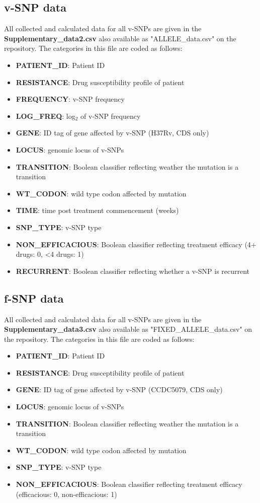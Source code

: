 \documentclass[12pt, oneside]{article}   	%
\begin{document}
\subsection{v-SNP data}
All collected and calculated data for all v-SNPs are given in the \textbf{Supplementary\_data2.csv} also available as "ALLELE\_data.csv" on the repository.
The categories in this file are coded as follows:
\begin{itemize}
\item \textbf{PATIENT\_ID}: Patient ID
\item \textbf{RESISTANCE}:  Drug susceptibility profile of patient
\item \textbf{FREQUENCY}: v-SNP frequency
\item \textbf{LOG\_FREQ}: log$_2$ of v-SNP frequency
\item \textbf{GENE}: ID tag of gene affected by v-SNP (H37Rv, CDS only)
\item \textbf{LOCUS}:  genomic locus of v-SNPs
\item \textbf{TRANSITION}: Boolean classifier reflecting weather the mutation is a transition
\item \textbf{WT\_CODON}: wild type codon affected by mutation
\item \textbf{TIME}: time post treatment commencement (weeks)
\item \textbf{SNP\_TYPE}: v-SNP type
\item \textbf{NON\_EFFICACIOUS}: Boolean classifier reflecting treatment efficacy (4+ drugs: 0, <4 drugs: 1)
\item \textbf{RECURRENT}: Boolean classifier reflecting whether a v-SNP is recurrent
\end{itemize}

\subsection{f-SNP data}
All collected and calculated data for all v-SNPs are given in the \textbf{Supplementary\_data3.csv} also available as "FIXED\_ALLELE\_data.csv" on the repository.
The categories in this file are coded as follows:
\begin{itemize}
\item \textbf{PATIENT\_ID}: Patient ID
\item \textbf{RESISTANCE}: Drug susceptibility profile of patient
\item \textbf{GENE}: ID tag of gene affected by v-SNP (CCDC5079, CDS only)
\item \textbf{LOCUS}:  genomic locus of v-SNPs
\item \textbf{TRANSITION}: Boolean classifier reflecting weather the mutation is a transition
\item \textbf{WT\_CODON}: wild type codon affected by mutation
\item \textbf{SNP\_TYPE}: v-SNP type
\item \textbf{NON\_EFFICACIOUS}: Boolean classifier reflecting treatment efficacy (efficacious: 0, non-efficacious: 1)
\end{itemize}
\end{document}
